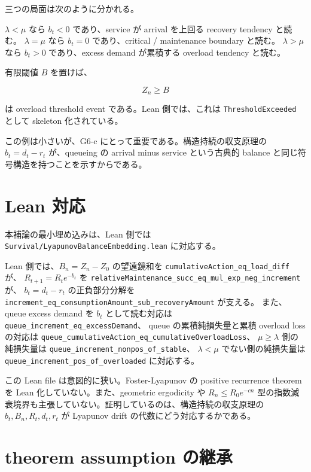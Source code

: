 \documentclass[12pt,a4paper]{article}
\begin{document}
三つの局面は次のように分かれる。

\(\lambda<\mu\) なら \(b_{t}<0\) であり、service が arrival を上回る recovery tendency と読む。 \(\lambda=\mu\) なら \(b_{t}=0\) であり、critical / maintenance boundary と読む。 \(\lambda>\mu\) なら \(b_{t}>0\) であり、excess demand が累積する overload tendency と読む。

有限閾値 \(B\) を置けば、

\[
Z_{n}\ge B
\]

は overload threshold event である。Lean 側では、これは \texttt{ThresholdExceeded} として skeleton 化されている。

この例は小さいが、G6-c にとって重要である。構造持続の収支原理の \(b_{t}=d_{t}-r_{t}\) が、queueing の arrival minus service という古典的 balance と同じ符号構造を持つことを示すからである。

\section{Lean 対応}\label{lean-ux5bfeux5fdc}

本補論の最小埋め込みは、Lean 側では \texttt{Survival/LyapunovBalanceEmbedding.lean} に対応する。

Lean 側では、\(B_{n}=Z_{n}-Z_0\) の望遠鏡和を \texttt{cumulativeAction\_eq\_load\_diff} が、 \(R_{t+1}=R_{t} e^{-b_{t}}\) を \texttt{relativeMaintenance\_succ\_eq\_mul\_exp\_neg\_increment} が、 \(b_{t}=d_{t}-r_{t}\) の正負部分分解を \texttt{increment\_eq\_consumptionAmount\_sub\_recoveryAmount} が支える。 また、queue excess demand を \(b_{t}\) として読む対応は \texttt{queue\_increment\_eq\_excessDemand}、 queue の累積純損失量と累積 overload loss の対応は \texttt{queue\_cumulativeAction\_eq\_cumulativeOverloadLoss}、 \(\mu\ge\lambda\) 側の純損失量は \texttt{queue\_increment\_nonpos\_of\_stable}、 \(\lambda<\mu\) でない側の純損失量は \texttt{queue\_increment\_pos\_of\_overloaded} に対応する。

この Lean file は意図的に狭い。Foster-Lyapunov の positive recurrence theorem を Lean 化していない。また、geometric ergodicity や \(R_{n}\le R_0e^{-cn}\) 型の指数減衰境界も主張していない。証明しているのは、構造持続の収支原理の \(b_{t},B_{n},R_{t},d_{t},r_{t}\) が Lyapunov drift の代数にどう対応するかである。

\section{theorem assumption の継承}\label{theorem-assumption-ux306eux7d99ux627f}
\end{document}

